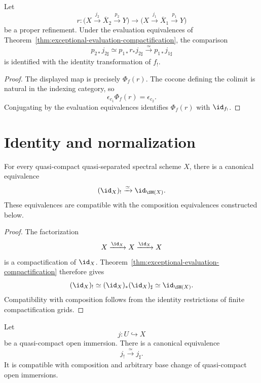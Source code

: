 \begin{proposition}
\label{prop:exceptional-refinement-functoriality}
Let
\[
    r:
    \bigl(
      X\xrightarrow{j_2}\overline X_2\xrightarrow{p_2}Y
    \bigr)
    \longrightarrow
    \bigl(
      X\xrightarrow{j_1}\overline X_1\xrightarrow{p_1}Y
    \bigr)
\]
be a proper refinement.  Under the evaluation equivalences of
Theorem~\ref{thm:exceptional-evaluation-compactification}, the comparison
\[
    p_{2*}j_{2\sharp}
    \simeq
    p_{1*}r_*j_{2\sharp}
    \xrightarrow{\simeq}
    p_{1*}j_{1\sharp}
\]
is identified with the identity transformation of \(f_!\).
\end{proposition}

\begin{proof}
The displayed map is precisely \(\Phi_f(r)\).  The cocone defining the
colimit is natural in the indexing category, so
\[
    \epsilon_{c_1}\Phi_f(r)
    =
    \epsilon_{c_2}.
\]
Conjugating by the evaluation equivalences identifies \(\Phi_f(r)\) with
\(\id_{f_!}\).
\end{proof}

\section{Identity and normalization}
\label{sec:exceptional-normalization}

\begin{proposition}
\label{prop:exceptional-identity}
For every quasi-compact quasi-separated spectral scheme \(X\), there is a
canonical equivalence
\[
    (\id_X)_!
    \xrightarrow{\simeq}
    \id_{\SH(X)}.
\]
These equivalences are compatible with the composition equivalences
constructed below.
\end{proposition}

\begin{proof}
The factorization
\[
    X\xrightarrow{\id_X}X\xrightarrow{\id_X}X
\]
is a compactification of \(\id_X\).  Theorem~\ref{thm:exceptional-evaluation-compactification}
therefore gives
\[
    (\id_X)_!
    \simeq
    (\id_X)_*(\id_X)_\sharp
    \simeq
    \id_{\SH(X)}.
\]
Compatibility with composition follows from the identity restrictions of
finite compactification grids.
\end{proof}

\begin{theorem}
\label{thm:exceptional-open-normalization}
Let
\[
    j:U\hookrightarrow X
\]
be a quasi-compact open immersion.  There is a canonical equivalence
\[
    j_!
    \xrightarrow{\simeq}
    j_\sharp.
\]
It is compatible with composition and arbitrary base change of
quasi-compact open immersions.
\end{theorem}

